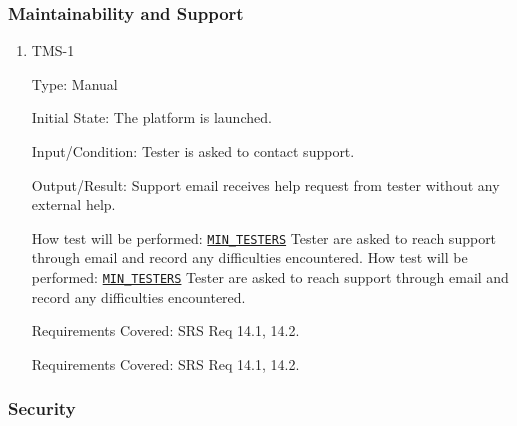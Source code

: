 \documentclass[12pt, titlepage]{article}
\begin{document}
\subsubsection{Maintainability and Support}

\begin{enumerate}

  \item{TMS-1\\}

        Type: Manual

        Initial State: The platform is launched.

        Input/Condition: Tester is asked to contact support.

        Output/Result: Support email receives help request from tester without any external help.

        How test will be performed: \hyperref[MIN_TESTERS]{\texttt{MIN\_TESTERS}} Tester are asked to reach
        support through email and record any difficulties encountered.
How test will be performed: \hyperref[MIN_TESTERS]{\texttt{MIN\_TESTERS}} Tester are asked to reach
support through email and record any difficulties encountered.

Requirements Covered: SRS Req 14.1, 14.2.

        Requirements Covered: SRS Req 14.1, 14.2.

\end{enumerate}

\subsubsection{Security}
\end{document}
